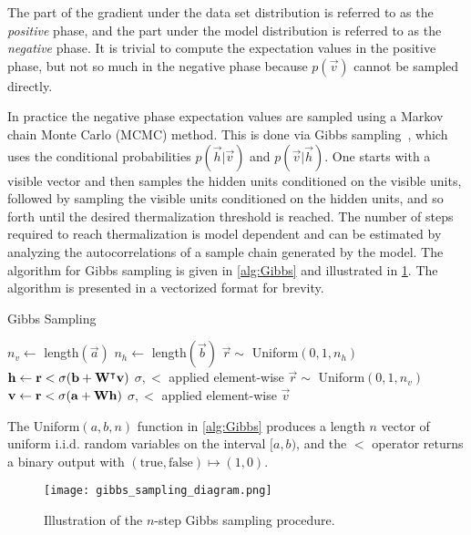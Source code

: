 The part of the gradient under the data set distribution is referred to as the \textit{positive} phase, and the part under the model distribution is referred to as the \textit{negative} phase.
It is trivial to compute the expectation values in the positive phase, but not so much in the negative phase because \( p(\vec{v}) \) cannot be sampled directly.

In practice the negative phase expectation values are sampled using a Markov chain Monte Carlo (MCMC) method.
This is done via Gibbs sampling~\cite{hinton_rbm_training}, which uses the conditional probabilities \( p(\vec{h}|\vec{v}) \) and \( p(\vec{v}|\vec{h}) \).
One starts with a visible vector and then samples the hidden units conditioned on the visible units, followed by sampling the visible units conditioned on the hidden units, and so forth until the desired thermalization threshold is reached.
The number of steps required to reach thermalization is model dependent and can be estimated by analyzing the autocorrelations of a sample chain generated by the model.
The algorithm for Gibbs sampling is given in \cref{alg:Gibbs} and illustrated in \cref{fig:gibbs_sampling_diagram}.
The algorithm is presented in a vectorized format for brevity.

\begin{algorithm}
\caption{Gibbs Sampling}
\begin{algorithmic}[1]
        \State $n_v \gets$ length$(\vec{a})$
        \State $n_h \gets$ length$(\vec{b})$
            \State $\vec{r} \sim$ Uniform$(0, 1, n_h)$
            \State $\mathbf{h} \gets \mathbf{r} < \sigma(\mathbf{b} + \mathbf{W}^\intercal\mathbf{v})$
                \Comment $\sigma, <$ applied element-wise
            \State $\vec{r} \sim$ Uniform$(0, 1, n_v)$
            \State $\mathbf{v} \gets \mathbf{r} < \sigma(\mathbf{a} + \mathbf{W}\mathbf{h})$
                \Comment $\sigma, <$ applied element-wise
        \EndFor
        \State \Return $\vec{v}$
    \EndProcedure
\end{algorithmic}
\label{alg:Gibbs}
\end{algorithm}
The Uniform$(a, b, n)$ function in \cref{alg:Gibbs} produces a length \( n \) vector of uniform i.i.d. random variables on the interval $[a, b)$, and the \( < \) operator returns a binary output with \( (\text{true}, \text{false}) \mapsto (1, 0) \).

\begin{figure}
    \begin{center}
        \texttt{[image: gibbs\_sampling\_diagram.png]}
    \end{center}
    \caption{Illustration of the \( n \)-step Gibbs sampling procedure.}
    \label{fig:gibbs_sampling_diagram}
\end{figure}

